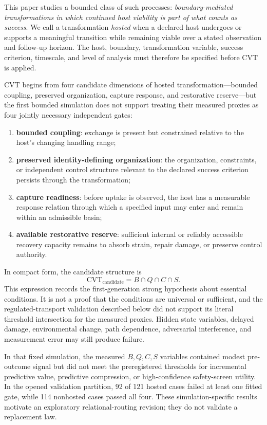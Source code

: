 \documentclass[11pt]{article}
\begin{document}
This paper studies a bounded class of such processes: \emph{boundary-mediated transformations in which continued host viability is part of what counts as success}. We call a transformation \emph{hosted} when a declared host undergoes or supports a meaningful transition while remaining viable over a stated observation and follow-up horizon. The host, boundary, transformation variable, success criterion, timescale, and level of analysis must therefore be specified before CVT is applied.

CVT begins from four candidate dimensions of hosted transformation---bounded coupling, preserved organization, capture response, and restorative reserve---but the first bounded simulation does not support treating their measured proxies as four jointly necessary independent gates:
\begin{enumerate}[label=(\roman*)]
    \item \textbf{bounded coupling}: exchange is present but constrained relative to the host's changing handling range;
    \item \textbf{preserved identity-defining organization}: the organization, constraints, or independent control structure relevant to the declared success criterion persists through the transformation;
    \item \textbf{capture readiness}: before uptake is observed, the host has a measurable response relation through which a specified input may enter and remain within an admissible basin;
    \item \textbf{available restorative reserve}: sufficient internal or reliably accessible recovery capacity remains to absorb strain, repair damage, or preserve control authority.
\end{enumerate}

In compact form, the candidate structure is
\begin{equation}
    \mathrm{CVT}_{\mathrm{candidate}}
    =
    B\cap Q\cap C\cap S.
\end{equation}
This expression records the first-generation strong hypothesis about essential conditions. It is not a proof that the conditions are universal or sufficient, and the regulated-transport validation described below did not support its literal threshold intersection for the measured proxies. Hidden state variables, delayed damage, environmental change, path dependence, adversarial interference, and measurement error may still produce failure.

In that fixed simulation, the measured \(B,Q,C,S\) variables contained modest pre-outcome signal but did not meet the preregistered thresholds for incremental predictive value, predictive compression, or high-confidence safety-screen utility. In the opened validation partition, 92 of 121 hosted cases failed at least one fitted gate, while 114 nonhosted cases passed all four. These simulation-specific results motivate an exploratory relational-routing revision; they do not validate a replacement law.
\end{document}
